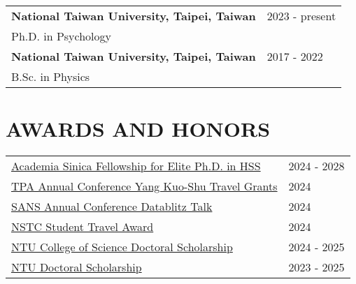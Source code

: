 \documentclass[a4paper,12pt]{article}
\newcommand{\sectionspace}{0pt} %
\begin{document}
\begin{flushright}
\begin{tabular}{@{}p{}@{}p{}@{}}
    \textbf{National Taiwan University, Taipei, Taiwan} & \hfill 2023 - present \\
    Ph.D. in Psychology & \\[6pt]
    \textbf{National Taiwan University, Taipei, Taiwan} & \hfill 2017 - 2022 \\
    B.Sc. in Physics & \\
\end{tabular}
\end{flushright}

\section*{AWARDS AND HONORS}
\begin{flushright}
\begin{tabular}{@{}p{}@{}p{}@{}}
\href{https://www.sinica.edu.tw/en/News_Content/56/2728}{Academia Sinica Fellowship for Elite Ph.D. in HSS} & \hfill 2024 - 2028 \\[2pt]
\href{https://www.tpa-tw.org/post/2024travel-grant}{TPA Annual Conference Yang Kuo-Shu Travel Grants} & \hfill 2024\\[2pt]
\href{https://socialaffectiveneuro.org/wp-content/uploads/2024/05/SANS-Conference-2024_Program_Final.pdf}{SANS Annual Conference Datablitz Talk} & \hfill 2024\\[2pt]
\href{https://www.nstc.gov.tw/sci/ch/detail/259f99f5-51ce-4582-8546-9d7caee96871}{NSTC Student Travel Award}  & \hfill 2024\\[2pt]
\href{https://www.science.ntu.edu.tw/file/rule50.pdf}{NTU College of Science Doctoral Scholarship}  & \hfill 2024 - 2025\\[2pt]
\href{https://ord.ntu.edu.tw/w/ordntu/GW_20072012180521920/}{NTU Doctoral Scholarship}  & \hfill 2023 - 2025\\[2pt]
\end{tabular}
\end{flushright}

\vspace{\sectionspace}
\end{document}
